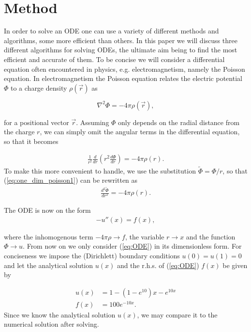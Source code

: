 \documentclass[twocolumn]{aastex62}
\begin{document}
\section{Method} \label{sec:method}
In order to solve an ODE one can use a variety of different methods and algorithms, some more efficient than others. In this paper we will discuss three different algorithms for solving ODEs, the ultimate aim being to find the most efficient and accurate of them. To be concise we will consider a differential equation often encountered in physics, e.g. electromagnetism, namely the Poisson equation. In electromagnetism the Poisson equation relates the electric potential $\Phi$ to a charge density $\rho(\vec{r})$ as 

\begin{equation}
	\nabla^2\Phi = -4\pi\rho(\vec{r}),
\end{equation}

for a positional vector $\vec{r}$. Assuming $\Phi$ only depends on the radial distance from the charge $r$, we can simply omit the angular terms in the differential equation, so that it becomes
 
\begin{align}
	\frac{1}{r^2}\frac{d}{dr}\left(r^2\frac{d\Phi}{dr}\right) = -4\pi\rho(r).
\label{eq:one_dim_poisson1}	
\end{align}
To make this more convenient to handle, we use the substitution $\tilde{\Phi} = \Phi/r$, so that (\ref{eq:one_dim_poisson1}) can be rewritten as 
\begin{align}
	\frac{d^2\tilde{\Phi}}{dr^2} = -4\pi\rho(r).
\end{align}

The ODE is now on the form 
\begin{align}
	-u''(x) = f(x),
	\label{eq:ODE}
\end{align}

where the inhomogenous term $-4\pi\rho\to f$, the variable $r\to x$ and the function $\Phi\to u$. From now on we only consider (\ref{eq:ODE}) in its dimensionless form. For conciseness we impose the (Dirichlett) boundary conditions $u(0) = u(1) = 0$ and let the analytical solution $u(x)$ and the r.h.s. of (\ref{eq:ODE}) $f(x)$ be given by

\begin{align}
	u(x) &= 1 - (1 - e^{10})x - e^{10x}\label{eq:analytical}\\
	f(x) &= 100e^{-10x}.
\end{align}
Since we know the analytical solution $u(x)$, we may compare it to the numerical solution after solving.
\end{document}
